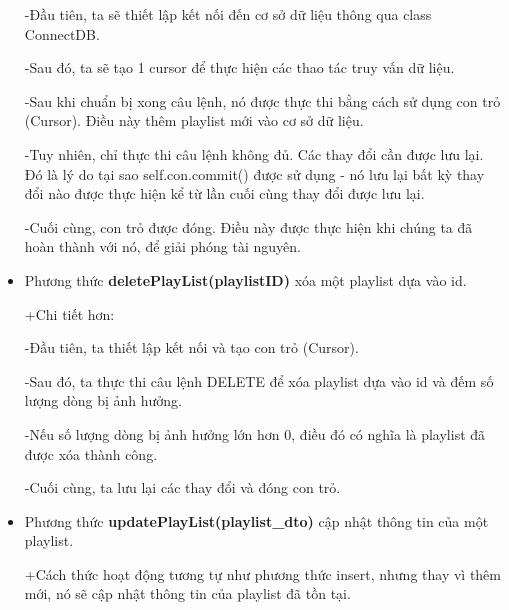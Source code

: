 \documentclass[a4paper]{article}
\begin{document}
\begin{flushleft}
\begin{itemize}
\begin{flushleft}
			      -Đầu tiên, ta sẽ thiết lập kết nối đến cơ sở dữ liệu thông qua class ConnectDB.

			      -Sau đó, ta sẽ tạo 1 cursor để thực hiện các thao tác truy vấn dữ liệu.

			      -Sau khi chuẩn bị xong câu lệnh, nó được thực thi bằng cách sử dụng con trỏ (Cursor). Điều này thêm playlist mới vào cơ sở dữ liệu.

			      -Tuy nhiên, chỉ thực thi câu lệnh không đủ. Các thay đổi cần được lưu lại. Đó là lý do tại sao self.con.commit() được sử dụng - nó lưu lại bất kỳ thay đổi nào được thực hiện kể từ lần cuối cùng thay đổi được lưu lại.

			      -Cuối cùng, con trỏ được đóng. Điều này được thực hiện khi chúng ta đã hoàn thành với nó, để giải phóng tài nguyên.
		      \end{flushleft}
		\item Phương thức \textbf{deletePlayList(playlistID)} xóa một playlist dựa vào id.
		      \begin{flushleft}
			      +Chi tiết hơn:

			      -Đầu tiên, ta thiết lập kết nối và tạo con trỏ (Cursor).

			      -Sau đó, ta thực thi câu lệnh DELETE để xóa playlist dựa vào id và đếm số lượng dòng bị ảnh hưởng.

			      -Nếu số lượng dòng bị ảnh hưởng lớn hơn 0, điều đó có nghĩa là playlist đã được xóa thành công.

			      -Cuối cùng, ta lưu lại các thay đổi và đóng con trỏ.
		      \end{flushleft}
		\item Phương thức \textbf{updatePlayList(playlist\_dto)} cập nhật thông tin của một playlist.
		      \begin{flushleft}
			      +Cách thức hoạt động tương tự như phương thức insert, nhưng thay vì thêm mới, nó sẽ cập nhật thông tin của playlist đã tồn tại.
		      \end{flushleft}
	\end{itemize}
\end{flushleft}
\end{document}
